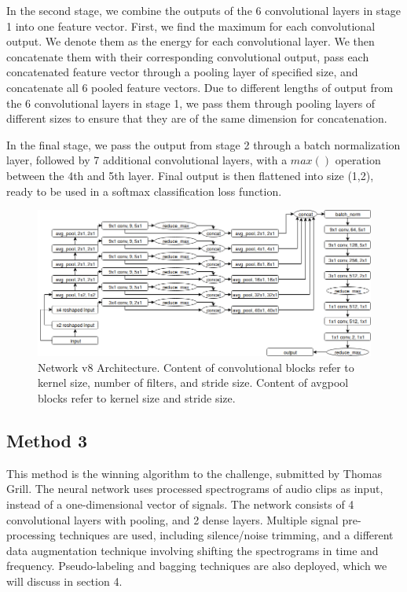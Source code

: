 \documentclass[10pt,twocolumn,letterpaper]{article}
\begin{document}
In the second stage, we combine the outputs of the 6 convolutional layers
in stage 1 into one feature vector. First, we find the maximum for each
convolutional output. We denote them as the energy for each convolutional
layer. We then concatenate them with their corresponding convolutional
output, pass each concatenated feature vector through a pooling layer of
specified size, and concatenate all 6 pooled feature vectors. Due to
different lengths of output from the 6 convolutional layers in stage 1, we
pass them through pooling layers of different sizes to ensure that they are
of the same dimension for concatenation.

In the final stage, we pass the output from stage 2 through a batch
normalization layer, followed by 7 additional convolutional layers, with a
\(max()\) operation between the 4th and 5th layer. Final output is then
flattened into size (1,2), ready to be used in a softmax classification
loss function.

\begin{figure}
	\centering
	\includegraphics[width=\textwidth]{v8_diagram}
	\caption{Network v8 Architecture. Content of convolutional blocks refer
	to kernel size, number of filters, and stride size. Content of avgpool
	blocks refer to kernel size and stride size.}
\end{figure}

\subsection{Method 3}

This method is the winning algorithm to the challenge, submitted by Thomas
Grill. The neural network uses processed spectrograms of audio clips as
input, instead of a one-dimensional vector of signals. The network consists
of 4 convolutional layers with pooling, and 2 dense layers. Multiple signal
pre-processing techniques are used, including silence/noise trimming, and a
different data augmentation technique involving shifting the spectrograms
in time and frequency.  Pseudo-labeling and bagging techniques are also
deployed, which we will discuss in section 4.
\end{document}
